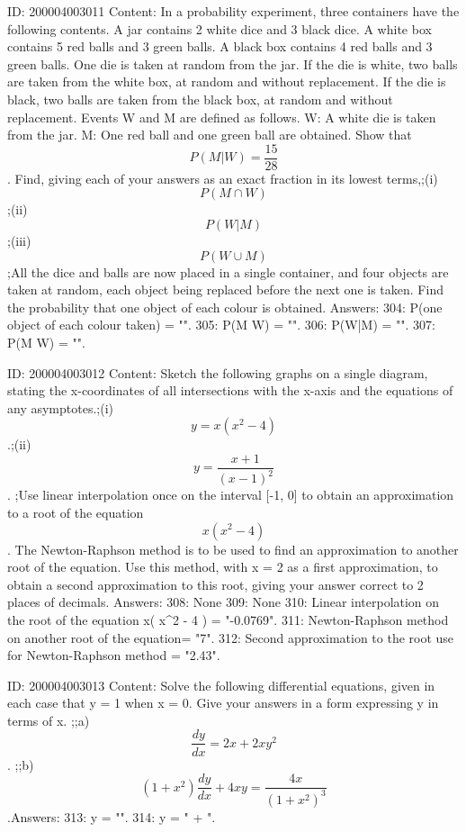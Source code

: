 \documentclass{article}
\begin{document}
ID: 200004003011
Content:
In a probability experiment, three containers have the following contents. A jar contains 2 white dice and 3 black dice. A white box contains 5 red balls and 3 green balls. A black box contains 4 red balls and 3 green balls. One die is taken at random from the jar. If the die is white, two balls are taken from the white box, at random and without replacement. If the die is black, two balls are taken from the black box, at random and without   replacement. Events W and M are defined as follows. W: A white die is taken from the jar. M: One red ball and one green ball are obtained. Show that  $$P( M|W ) = \frac{15}{28}$$. Find, giving each of your answers as an exact fraction in its lowest terms,;(i)  $$P( M \cap W )$$;(ii) $$P(W | M)$$;(iii)  $$P( W \cup M )$$;All the dice and balls are now placed in a single container, and four objects are taken at random, each object being replaced before the next one is taken. Find the probability that one object of each colour is obtained. Answers:
304: P(one object of each colour taken) = "".
305: P(M \cap W) = "".
306: P(W|M) = "".
307: P(M \cup W) = "".

ID: 200004003012
Content:
Sketch the following graphs on a single diagram, stating the x-coordinates of all intersections with the x-axis and the equations of any asymptotes.;(i)  $$y = x( x^2  - 4 )$$.;(ii)  $$y = \frac{x + 1}{(x - 1)^2} $$. ;Use linear interpolation once on the interval [-1, 0] to obtain an approximation to a root of the equation  $$x( x^2  - 4 )$$. The Newton-Raphson method is to be used to find an approximation to another root of the equation. Use this method, with x = 2 as a first approximation, to obtain a second approximation to this root, giving your   answer correct to 2 places of decimals.  Answers:
308: None
309: None
310: Linear interpolation on the root of the equation x( x^2  - 4 ) = "-0.0769".
311: Newton-Raphson method on another root of the equation= "7".
312: Second approximation to the root use for Newton-Raphson method = "2.43".

ID: 200004003013
Content:
Solve the following differential equations, given in each case that y = 1 when x = 0. Give your answers in a form expressing y in terms of x. ;;a)$$\frac{dy}{dx} = 2x + 2xy^2 $$. ;;b)$$( 1 + x^2 )\frac{dy}{dx} + 4xy = \frac{4x}{( 1 + x^2  )^3}$$.Answers:
313: y = "".
314: y = " + ".
\end{document}

